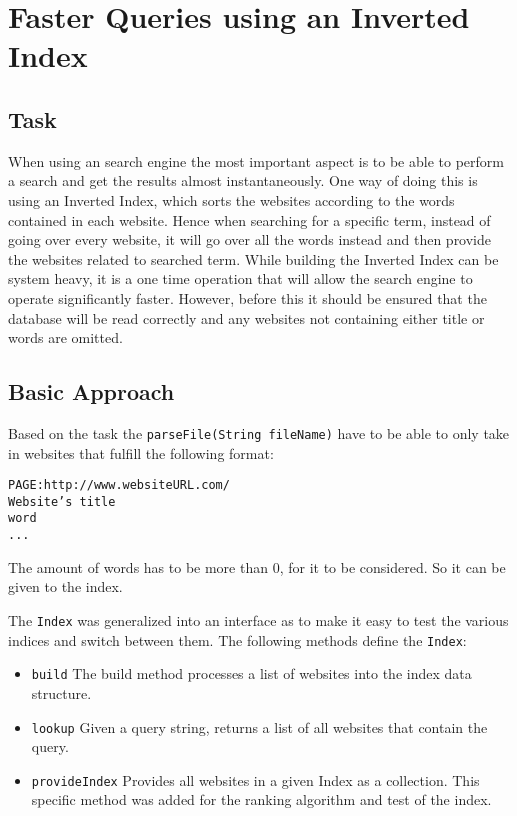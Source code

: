 \chapter{Faster Queries using an Inverted Index}


\section{Task}
When using an search engine the most important aspect is to be able to perform a search and get the results almost instantaneously. One way of doing this is using an Inverted Index, which sorts the websites according to the words contained in each website. Hence when searching for a specific term, instead of going over every website, it will go over all the words instead and then provide the websites related to searched term. While building the Inverted Index can be system heavy, it is a one time operation that will allow the search engine to operate significantly faster. However, before this it should be ensured that the database will be read correctly and any websites not containing either title or words are omitted.

\section{Basic Approach}
Based on the task the {\tt parseFile(String fileName)} have to be able to only take in websites that fulfill the following format:

{\tt *PAGE:http://www.websiteURL.com/} \\
{\tt Website's title} \\
{\tt word} \\
{\tt ...}

The amount of words has to be more than 0, for it to be considered. So it can be given to the index.

The {\tt Index} was generalized into an interface as to make it easy to test the various indices and switch between them. The following methods define the {\tt Index}:
\begin{itemize}
    \item {\tt build} The build method processes a list of websites into the index data structure.
    \item {\tt lookup} Given a query string, returns a list of all websites that contain the query.
    \item {\tt provideIndex} Provides all websites in a given Index as a collection. This specific method was added for the ranking algorithm and test of the index.
\end{itemize}

